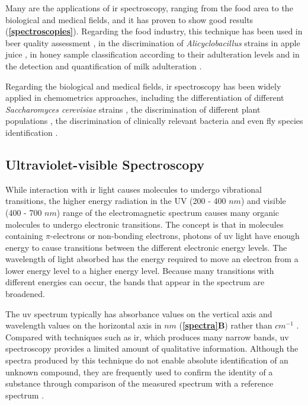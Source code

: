 Many are the applications of \gls{ir} spectroscopy, ranging from the food area to the biological and medical fields, and it has proven to show good results (\textbf{\autoref{spectroscopies}}). Regarding the food industry, this technique has been used in beer quality assessment \citep{polshin2011beer}, in the discrimination of \textit{Alicyclobacillus} strains in apple juice \citep{lin2005rapid}, in honey sample classification according to their adulteration levels \citep{norazian2012hybrid} and in the detection and quantification of milk adulteration \citep{santos2013rapid}.


Regarding the biological and medical fields, \gls{ir} spectroscopy has been widely applied in  chemometrics approaches, including the differentiation of different \textit{Saccharomyces cerevisiae} strains \citep{cozzolino2006combining}, the discrimination of different plant populations \citep{khairudin2014direct, uarrota2014metabolomics}, the discrimination of clinically relevant bacteria \citep{preisner2007fourier} and even fly species identification \citep{de2011barcoding}.


\subsection{Ultraviolet-visible Spectroscopy}

While interaction with \gls{ir} light causes molecules to undergo vibrational transitions, the higher energy radiation in the UV (200 - 400 $ nm $) and visible (400 - 700 $ nm $) range of the electromagnetic spectrum causes many organic molecules to undergo electronic transitions. The concept is that in molecules containing $ \pi $-electrons or non-bonding electrons, photons of \acrfull{uv} light have enough energy to cause transitions between the different electronic energy levels. The wavelength of light absorbed has the energy required to move an electron from a lower energy level to a higher energy level. Because many transitions with different energies can occur, the bands that appear in the spectrum are broadened.

The \gls{uv} spectrum typically has absorbance values on the vertical axis and  wavelength values on the horizontal axis in $ nm $ (\textbf{\autoref{spectra}B}) rather than $ cm^{-1} $ \citep{soderberg2010organic}. Compared with techniques such as \gls{ir}, which produces many narrow bands, \gls{uv} spectroscopy provides a limited amount of qualitative information. Although the spectra produced by this technique do not enable absolute identification of an unknown compound, they are frequently used to confirm the identity of a substance through comparison of the measured spectrum with a reference spectrum \citep{owen1996fundamentals}.

